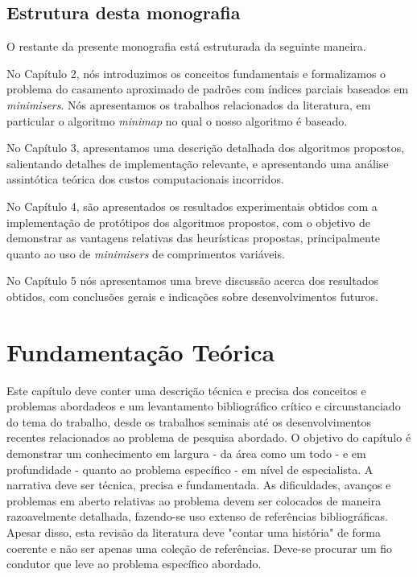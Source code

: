 \documentclass[bsc, oneside, scr, 12pt]{ufpethesis}
\newenvironment{comment}{\itshape\noindent<begin comment -- ommit this in the final version>\par}{\par\noindent<end comment>\rm}
\newcommand{\minimisers}{\textit{minimisers}\/\xspace}
\begin{document}
\section{Estrutura desta monografia}

O restante da presente monografia está estruturada da seguinte maneira.

No Capítulo 2, nós introduzimos os conceitos fundamentais e formalizamos o problema do casamento aproximado de padrões com índices parciais baseados em \minimisers. Nós apresentamos os trabalhos relacionados da literatura, em particular o algoritmo \textit{minimap}\cite{} no qual o nosso algoritmo é baseado.

No Capítulo 3, apresentamos uma descrição detalhada dos algoritmos propostos, salientando detalhes de implementação relevante, e apresentando uma análise assintótica teórica dos custos computacionais incorridos.

No Capítulo 4, são apresentados os resultados experimentais obtidos com a implementação de protótipos dos algoritmos propostos, com o objetivo de demonstrar as vantagens relativas das heurísticas propostas, principalmente quanto ao uso de \minimisers de comprimentos variáveis.

No Capítulo 5 nós apresentamos uma breve discussão acerca dos resultados obtidos, com conclusões gerais e indicações sobre desenvolvimentos futuros.




\chapter{Fundamentação Teórica}

\begin{comment}
	Este capítulo deve conter uma descrição técnica e precisa dos conceitos e problemas abordadeos e um levantamento bibliográfico crítico e circunstanciado do tema do trabalho, desde os trabalhos seminais até os desenvolvimentos recentes relacionados ao problema de pesquisa abordado. O objetivo do capítulo é demonstrar um conhecimento em largura - da área como um todo - e em profundidade - quanto ao problema específico - em nível de especialista. A narrativa deve ser técnica, precisa e fundamentada. As dificuldades, avanços e problemas em aberto relativas ao problema devem ser colocados de maneira razoavelmente detalhada, fazendo-se uso extenso de referências bibliográficas. Apesar disso, esta revisão da literatura deve "contar uma história" de forma coerente e não ser apenas uma coleção de referências. Deve-se procurar um fio condutor que leve ao problema específico abordado.
\end{comment}
\end{document}
